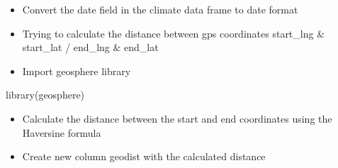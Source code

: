 \documentclass[
]{article}
\newenvironment{Shaded}{\begin{snugshade}}{\end{snugshade}}
\newcommand{\AttributeTok}[1]{\textcolor[rgb]{0.77,0.63,0.00}{#1}}
\newcommand{\FunctionTok}[1]{\textcolor[rgb]{0.00,0.00,0.00}{#1}}
\newcommand{\NormalTok}[1]{#1}
\newcommand{\OtherTok}[1]{\textcolor[rgb]{0.56,0.35,0.01}{#1}}
\newcommand{\SpecialCharTok}[1]{\textcolor[rgb]{0.00,0.00,0.00}{#1}}
\providecommand{\tightlist}{%
  \setlength{\itemsep}{0pt}\setlength{\parskip}{0pt}}
\begin{document}
\fontsize{10}{12}
\selectfont

\begin{itemize}
\tightlist
\item
  Convert the date field in the climate data frame to date format
\end{itemize}

\fontsize{9}{11}
\selectfont

\begin{Shaded}
\end{Shaded}

\fontsize{10}{12}
\selectfont

\begin{itemize}
\tightlist
\item
  Trying to calculate the distance between gps coordinates start\_lng \&
  start\_lat / end\_lng \& end\_lat
\item
  Import geosphere library
\end{itemize}

\fontsize{9}{11}
\selectfont

\begin{Shaded}
\begin{Highlighting}[]
\FunctionTok{library}\NormalTok{(geosphere) }
\end{Highlighting}
\end{Shaded}

\fontsize{10}{12}
\selectfont

\begin{itemize}
\tightlist
\item
  Calculate the distance between the start and end coordinates using the
  Haversine formula
\item
  Create new column geodist with the calculated distance
\end{itemize}

\fontsize{9}{11}
\selectfont

\begin{Shaded}
\end{Shaded}
\end{document}
